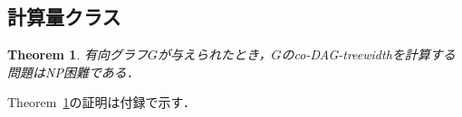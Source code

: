 \documentclass[master]{kuisthesis}		%
\theoremstyle{plain}
\newtheorem{theorem}{Theorem}
\newtheorem{lemma}{Lemma}
\theoremstyle{definition}
\newtheorem{definition*}{Definition}
\begin{document}
\subsection{計算量クラス}

\begin{theorem}\label{r-NP困難}
    有向グラフ$G$が与えられたとき，$G$のco-DAG-treewidthを計算する問題はNP困難である．
\end{theorem}

Theorem~\ref{r-NP困難}の証明は付録で示す．

\end{document}
